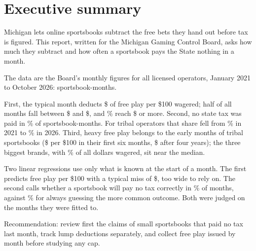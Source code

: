 \section*{Executive summary}

Michigan lets online sportsbooks subtract the free bets they hand out before tax is figured. This report, written for the Michigan Gaming Control Board, asks how much they subtract and how often a sportsbook pays the State nothing in a month.

The data are the Board's monthly figures for all  licensed operators, January 2021 to October 2026:  sportsbook-months.

First, the typical month deducts \$ of free play per \$100 wagered; half of all months fall between \$ and \$, and \% reach \$ or more. Second, no state tax was paid in \% of sportsbook-months. For tribal operators that share fell from \% in 2021 to \% in 2026. Third, heavy free play belongs to the early months of tribal sportsbooks (\$ per \$100 in their first six months, \$ after four years); the three biggest brands, with \% of all dollars wagered, sit near the median.

Two linear regressions use only what is known at the start of a month. The first predicts free play per \$100 with a typical miss of \$, too wide to rely on. The second calls whether a sportsbook will pay no tax correctly in \% of months, against \% for always guessing the more common outcome. Both were judged on the months they were fitted to.

Recommendation: review first the claims of small sportsbooks that paid no tax last month, track lump deductions separately, and collect free play issued by month before studying any cap.
